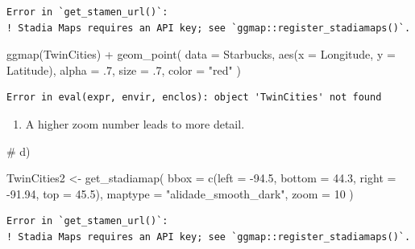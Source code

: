 \documentclass[
  letterpaper,
  DIV=11,
  numbers=noendperiod]{scrreprt}
\newenvironment{Shaded}{\begin{snugshade}}{\end{snugshade}}
\newcommand{\AttributeTok}[1]{\textcolor[rgb]{0.40,0.45,0.13}{#1}}
\newcommand{\CommentTok}[1]{\textcolor[rgb]{0.37,0.37,0.37}{#1}}
\newcommand{\DecValTok}[1]{\textcolor[rgb]{0.68,0.00,0.00}{#1}}
\newcommand{\FloatTok}[1]{\textcolor[rgb]{0.68,0.00,0.00}{#1}}
\newcommand{\FunctionTok}[1]{\textcolor[rgb]{0.28,0.35,0.67}{#1}}
\newcommand{\NormalTok}[1]{\textcolor[rgb]{0.00,0.23,0.31}{#1}}
\newcommand{\OtherTok}[1]{\textcolor[rgb]{0.00,0.23,0.31}{#1}}
\newcommand{\SpecialCharTok}[1]{\textcolor[rgb]{0.37,0.37,0.37}{#1}}
\newcommand{\StringTok}[1]{\textcolor[rgb]{0.13,0.47,0.30}{#1}}
\providecommand{\tightlist}{%
  \setlength{\itemsep}{0pt}\setlength{\parskip}{0pt}}\usepackage{longtable,booktabs,array}
\begin{document}
\begin{verbatim}
Error in `get_stamen_url()`:
! Stadia Maps requires an API key; see `ggmap::register_stadiamaps()`.
\end{verbatim}

\begin{Shaded}
\begin{Highlighting}[]
\FunctionTok{ggmap}\NormalTok{(TwinCities) }\SpecialCharTok{+}
  \FunctionTok{geom\_point}\NormalTok{(}
    \AttributeTok{data =}\NormalTok{ Starbucks,}
    \FunctionTok{aes}\NormalTok{(}\AttributeTok{x =}\NormalTok{ Longitude, }\AttributeTok{y =}\NormalTok{ Latitude),}
    \AttributeTok{alpha =}\NormalTok{ .}\DecValTok{7}\NormalTok{, }\AttributeTok{size =}\NormalTok{ .}\DecValTok{7}\NormalTok{,}
    \AttributeTok{color =} \StringTok{"red"}
\NormalTok{  )}
\end{Highlighting}
\end{Shaded}

\begin{verbatim}
Error in eval(expr, envir, enclos): object 'TwinCities' not found
\end{verbatim}

\begin{enumerate}
\def\labelenumi{\alph{enumi}.}
\setcounter{enumi}{2}
\tightlist
\item
  A higher zoom number leads to more detail.
\end{enumerate}

\begin{Shaded}
\begin{Highlighting}[]
\CommentTok{\# d)}

\NormalTok{TwinCities2 }\OtherTok{\textless{}{-}} \FunctionTok{get\_stadiamap}\NormalTok{(}
  \AttributeTok{bbox =} \FunctionTok{c}\NormalTok{(}\AttributeTok{left =} \SpecialCharTok{{-}}\FloatTok{94.5}\NormalTok{, }\AttributeTok{bottom =} \FloatTok{44.3}\NormalTok{, }\AttributeTok{right =} \SpecialCharTok{{-}}\FloatTok{91.94}\NormalTok{, }\AttributeTok{top =} \FloatTok{45.5}\NormalTok{),}
  \AttributeTok{maptype =} \StringTok{"alidade\_smooth\_dark"}\NormalTok{,}
  \AttributeTok{zoom =} \DecValTok{10}
\NormalTok{)}
\end{Highlighting}
\end{Shaded}

\begin{verbatim}
Error in `get_stamen_url()`:
! Stadia Maps requires an API key; see `ggmap::register_stadiamaps()`.
\end{verbatim}
\end{document}

